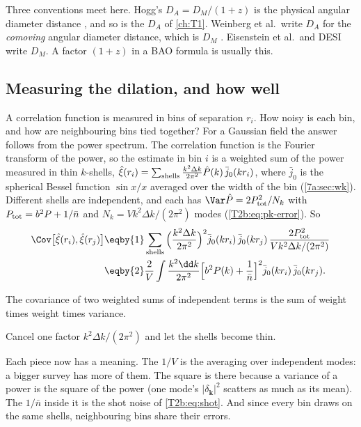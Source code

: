 \begin{pitfall}
Three conventions meet here. Hogg's $D_A=D_M/(1+z)$ is the physical angular diameter distance \cite[eq.~(18)]{Hogg1999}, and so is the $D_A$ of \cref{ch:T1}. Weinberg et al.\ write $D_A$ for the \emph{comoving} angular diameter distance, which is $D_M$ \cite[p.~46]{Weinberg2013}. Eisenstein et al.\ and DESI write $D_M$. A factor $(1+z)$ in a BAO formula is usually this.
\end{pitfall}

\subsection{Measuring the dilation, and how well}

A correlation function is measured in bins of separation $r_i$. How noisy is each bin, and how are neighbouring bins tied together? For a Gaussian field the answer follows from the power spectrum. The correlation function is the Fourier transform of the power, so the estimate in bin $i$ is a weighted sum of the power measured in thin $k$-shells, $\hat\xi(r_i)=\sum_{\rm shells}\frac{k^2\Delta k}{2\pi^2}\hat P(k)\,\bar j_0(kr_i)$, where $\bar j_0$ is the spherical Bessel function $\sin x/x$ averaged over the width of the bin (\cref{7a:sec:wk}). Different shells are independent, and each has $\Var\hat P=2P_{\rm tot}^2/N_k$ with $P_{\rm tot}=b^2P+1/\bar n$ and $N_k=Vk^2\Delta k/(2\pi^2)$ modes (\eqref{T2b:eq:pk-error}). So
\begin{align}
  \Cov\big[\hat\xi(r_i),\hat\xi(r_j)\big]
  &\eqby{1}\sum_{\rm shells}\Big(\frac{k^2\Delta k}{2\pi^2}\Big)^2\bar j_0(kr_i)\,\bar j_0(kr_j)\,\frac{2P_{\rm tot}^2}{Vk^2\Delta k/(2\pi^2)}\nonumber\\
  &\eqby{2}\frac{2}{V}\int\frac{k^2\dd k}{2\pi^2}\Big[b^2P(k)+\frac1{\bar n}\Big]^2\bar j_0(kr_i)\,\bar j_0(kr_j).
  \label{T2b:eq:xi-cov}
\end{align}
\begin{explain}
  \item The covariance of two weighted sums of independent terms is the sum of weight times weight times variance.
  \item Cancel one factor $k^2\Delta k/(2\pi^2)$ and let the shells become thin.
\end{explain}
Each piece now has a meaning. The $1/V$ is the averaging over independent modes: a bigger survey has more of them. The square is there because a variance of a power is the square of the power (one mode's $|\delta_{\bm k}|^2$ scatters as much as its mean). The $1/\bar n$ inside it is the shot noise of \eqref{T2b:eq:shot}. And since every bin draws on the same shells, neighbouring bins share their errors.

